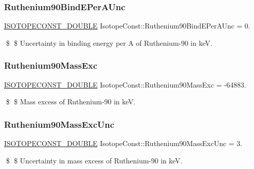\subsubsection{\texorpdfstring{Ruthenium90\+Bind\+E\+Per\+A\+Unc}{Ruthenium90BindEPerAUnc}}
{\footnotesize\ttfamily \mbox{\hyperlink{group___isotope_const-_macros_ga8f45a7272ce02c0b4c65c44636ed719a}{I\+S\+O\+T\+O\+P\+E\+C\+O\+N\+S\+T\+\_\+\+D\+O\+U\+B\+LE}} Isotope\+Const\+::\+Ruthenium90\+Bind\+E\+Per\+A\+Unc = 0.}

\$ \$ Uncertainty in binding energy per A of Ruthenium-\/90 in keV. \mbox{\label{group___isotope_const-_ruthenium-_ru90_ga6b201388b7125d9988d28b77d166032a}} 
\subsubsection{\texorpdfstring{Ruthenium90\+Mass\+Exc}{Ruthenium90MassExc}}
{\footnotesize\ttfamily \mbox{\hyperlink{group___isotope_const-_macros_ga8f45a7272ce02c0b4c65c44636ed719a}{I\+S\+O\+T\+O\+P\+E\+C\+O\+N\+S\+T\+\_\+\+D\+O\+U\+B\+LE}} Isotope\+Const\+::\+Ruthenium90\+Mass\+Exc = -\/64883.}

\$ \$ Mass excess of Ruthenium-\/90 in keV. \mbox{\label{group___isotope_const-_ruthenium-_ru90_ga1970d1980c7c0aa3b5af555245940f93}} 
\subsubsection{\texorpdfstring{Ruthenium90\+Mass\+Exc\+Unc}{Ruthenium90MassExcUnc}}
{\footnotesize\ttfamily \mbox{\hyperlink{group___isotope_const-_macros_ga8f45a7272ce02c0b4c65c44636ed719a}{I\+S\+O\+T\+O\+P\+E\+C\+O\+N\+S\+T\+\_\+\+D\+O\+U\+B\+LE}} Isotope\+Const\+::\+Ruthenium90\+Mass\+Exc\+Unc = 3.}

\$ \$ Uncertainty in mass excess of Ruthenium-\/90 in keV. \mbox{\label{group___isotope_const-_ruthenium-_ru90_ga1c19bc2368a7e453b58f3d883983ed37}} 
